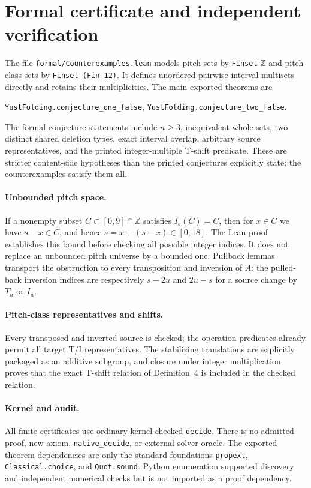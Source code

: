 \documentclass[10pt]{article}
\theoremstyle{remark}
\newcommand{\Z}{\mathbb Z}
\begin{document}
\section{Formal certificate and independent verification}
The file \texttt{formal/Counterexamples.lean} models pitch sets by
\texttt{Finset} $\Z$ and pitch-class sets by \texttt{Finset (Fin 12)}.
It defines unordered pairwise interval multisets directly and retains their
multiplicities. The main exported theorems are
\begin{center}
\texttt{YustFolding.conjecture\_one\_false},\qquad
\texttt{YustFolding.conjecture\_two\_false}.
\end{center}
The formal conjecture statements include $n\ge3$, inequivalent whole sets,
two distinct shared deletion types, exact interval overlap, arbitrary source
representatives, and the printed integer-multiple T-shift predicate. These
are stricter content-side hypotheses than the printed conjectures explicitly
state; the counterexamples satisfy them all.

\paragraph{Unbounded pitch space.}
If a nonempty subset $C\subset[0,9]\cap\Z$ satisfies $I_s(C)=C$, then for
$x\in C$ we have $s-x\in C$, and hence $s=x+(s-x)\in[0,18]$. The Lean
proof establishes this bound before checking all possible integer indices.
It does not replace an unbounded pitch universe by a bounded one. Pullback
lemmas transport the obstruction to every transposition and inversion of
$A$: the pulled-back inversion indices are respectively $s-2u$ and
$2u-s$ for a source change by $T_u$ or $I_u$.

\paragraph{Pitch-class representatives and shifts.}
Every transposed and inverted source is checked; the operation predicates
already permit all target T/I representatives. The stabilizing translations
are explicitly packaged as an additive subgroup, and closure under integer
multiplication proves that the exact T-shift relation of Definition~4 is
included in the checked relation.

\paragraph{Kernel and audit.}
All finite certificates use ordinary kernel-checked \texttt{decide}. There
is no admitted proof, new axiom, \texttt{native\_decide}, or external solver
oracle. The exported theorem dependencies are only the standard foundations
\texttt{propext}, \texttt{Classical.choice}, and \texttt{Quot.sound}.
Python enumeration supported discovery and independent numerical checks but
is not imported as a proof dependency.
\end{document}
